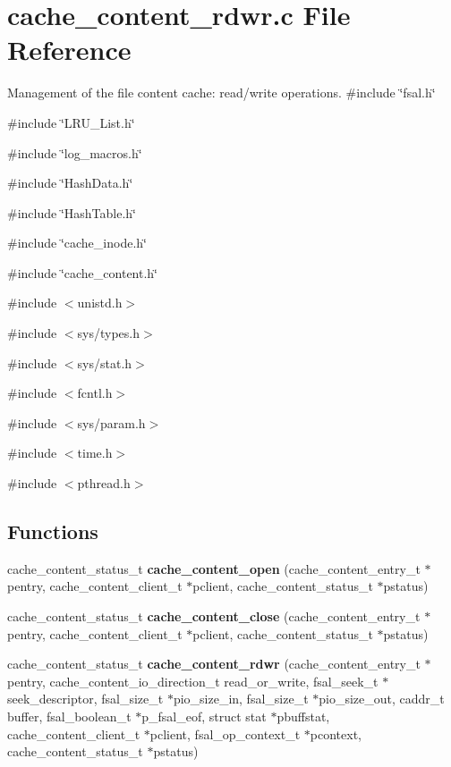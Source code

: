 \section{cache\_\-content\_\-rdwr.c File Reference}
\label{cache__content__rdwr_8c}


Management of the file content cache: read/write operations.  
{\ttfamily \#include \char`\"{}fsal.h\char`\"{}}\par
{\ttfamily \#include \char`\"{}LRU\_\-List.h\char`\"{}}\par
{\ttfamily \#include \char`\"{}log\_\-macros.h\char`\"{}}\par
{\ttfamily \#include \char`\"{}HashData.h\char`\"{}}\par
{\ttfamily \#include \char`\"{}HashTable.h\char`\"{}}\par
{\ttfamily \#include \char`\"{}cache\_\-inode.h\char`\"{}}\par
{\ttfamily \#include \char`\"{}cache\_\-content.h\char`\"{}}\par
{\ttfamily \#include $<$unistd.h$>$}\par
{\ttfamily \#include $<$sys/types.h$>$}\par
{\ttfamily \#include $<$sys/stat.h$>$}\par
{\ttfamily \#include $<$fcntl.h$>$}\par
{\ttfamily \#include $<$sys/param.h$>$}\par
{\ttfamily \#include $<$time.h$>$}\par
{\ttfamily \#include $<$pthread.h$>$}\par
\subsection*{Functions}
\begin{DoxyCompactItemize}
\item 
cache\_\-content\_\-status\_\-t {\bf cache\_\-content\_\-open} (cache\_\-content\_\-entry\_\-t $\ast$pentry, cache\_\-content\_\-client\_\-t $\ast$pclient, cache\_\-content\_\-status\_\-t $\ast$pstatus)
\item 
cache\_\-content\_\-status\_\-t {\bf cache\_\-content\_\-close} (cache\_\-content\_\-entry\_\-t $\ast$pentry, cache\_\-content\_\-client\_\-t $\ast$pclient, cache\_\-content\_\-status\_\-t $\ast$pstatus)
\item 
cache\_\-content\_\-status\_\-t {\bf cache\_\-content\_\-rdwr} (cache\_\-content\_\-entry\_\-t $\ast$pentry, cache\_\-content\_\-io\_\-direction\_\-t read\_\-or\_\-write, fsal\_\-seek\_\-t $\ast$seek\_\-descriptor, fsal\_\-size\_\-t $\ast$pio\_\-size\_\-in, fsal\_\-size\_\-t $\ast$pio\_\-size\_\-out, caddr\_\-t buffer, fsal\_\-boolean\_\-t $\ast$p\_\-fsal\_\-eof, struct stat $\ast$pbuffstat, cache\_\-content\_\-client\_\-t $\ast$pclient, fsal\_\-op\_\-context\_\-t $\ast$pcontext, cache\_\-content\_\-status\_\-t $\ast$pstatus)
\end{DoxyCompactItemize}


